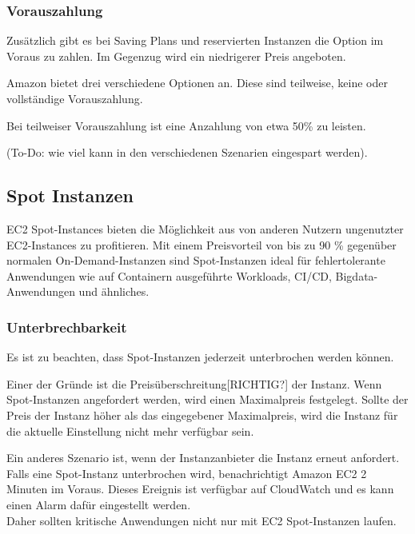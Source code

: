 \subsubsection{Vorauszahlung}
Zusätzlich gibt es bei Saving Plans und reservierten Instanzen die Option im Voraus zu zahlen.
Im Gegenzug wird ein niedrigerer Preis angeboten.

Amazon bietet drei verschiedene Optionen an. Diese sind teilweise, keine oder vollständige Vorauszahlung.

Bei teilweiser Vorauszahlung ist eine Anzahlung von etwa 50\% zu leisten.

(To-Do: wie viel kann in den verschiedenen Szenarien eingespart werden).

\subsection{Spot Instanzen }
EC2 Spot-Instances bieten die Möglichkeit aus von anderen Nutzern ungenutzter EC2-Instances zu profitieren.
Mit einem Preisvorteil von bis zu 90 \% gegenüber normalen On-Demand-Instanzen sind Spot-Instanzen ideal für fehlertolerante Anwendungen wie auf Containern ausgeführte Workloads, CI/CD, Bigdata-Anwendungen und ähnliches.
\\
\subsubsection{Unterbrechbarkeit}
Es ist zu beachten, dass Spot-Instanzen jederzeit unterbrochen werden können.   

Einer der Gründe ist die Preisüberschreitung[RICHTIG?] der Instanz. Wenn Spot-Instanzen angefordert werden, wird einen Maximalpreis festgelegt. Sollte der Preis der Instanz höher als das eingegebener Maximalpreis, wird die Instanz für die aktuelle Einstellung nicht mehr verfügbar sein.

Ein anderes Szenario ist, wenn der Instanzanbieter die Instanz erneut anfordert. Falls eine Spot-Instanz unterbrochen wird, benachrichtigt Amazon EC2 2 Minuten im Voraus. Dieses Ereignis ist verfügbar auf CloudWatch und es kann einen Alarm dafür eingestellt werden.
\\
Daher sollten kritische Anwendungen nicht nur mit EC2 Spot-Instanzen laufen.

